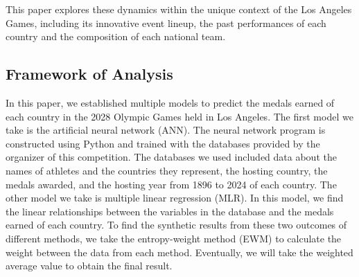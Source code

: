 \documentclass{mcmthesis}
\begin{document}
This paper explores these dynamics within the unique context of the Los Angeles Games, including its innovative event lineup, the past performances of each country and the composition of each national team.

\subsection{Framework of Analysis}
In this paper, we established multiple models to predict the medals earned of each country in the 2028 Olympic Games held in Los Angeles. The first model we take is the artificial neural network (ANN). The neural network program is constructed using Python and trained with the databases provided by the organizer of this competition. The databases we used included data about the names of athletes and the countries they represent, the hosting country, the medals awarded, and the hosting year from 1896 to 2024 of each country. The other model we take is multiple linear regression (MLR). In this model, we find the linear relationships between the variables in the database and the medals earned of each country. To find the synthetic results from these two outcomes of different methods, we take the entropy-weight method (EWM) to calculate the weight between the data from each method. Eventually, we will take the weighted average value to obtain the final result.  
\end{document}
